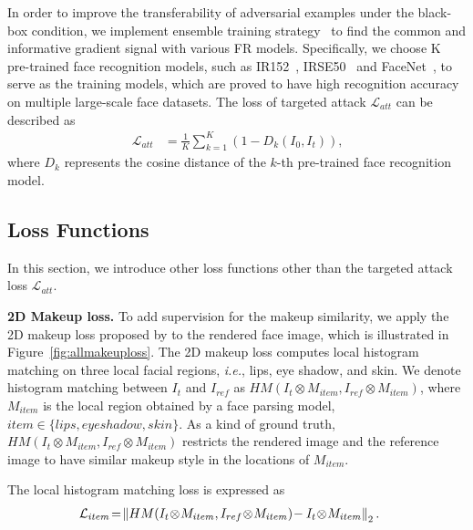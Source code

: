 \documentclass[10pt,journal,compsoc]{IEEEtran}
\begin{document}
In order to improve the transferability of adversarial examples under the black-box condition, we implement ensemble training strategy~\cite{liu2016delving,dong2018boosting,yin2021adv,hu2022protecting} to find the common and informative gradient signal with various FR models. Specifically, we choose K pre-trained face recognition models, such as IR152~\cite{he2016deep}, IRSE50~\cite{hu2018squeeze} and FaceNet~\cite{schroff2015facenet}, to serve as the training models, which are proved to have high recognition accuracy on multiple large-scale face datasets. The loss of targeted attack $\mathcal{L}_{att}$ can be described as 
\begin{equation}
	\begin{aligned}
	\mathcal{L}_{att} &=\frac{1}{K}\sum_{k=1}^{K}(1-D_k(I_0, I_t))\text{,}
	\end{aligned}
\end{equation} 
where $D_k$ represents the cosine distance of the $k$-th pre-trained face recognition model. 

\subsection{Loss Functions}
\label{subsection:loss}
In this section, we introduce other loss functions other than the targeted attack loss $\mathcal{L}_{att}$.

{\bf 2D Makeup loss.}
To add supervision for the makeup similarity, we apply the 2D makeup loss proposed by \cite{li2018beautygan} to the rendered face image, which is illustrated in Figure~\ref{fig:allmakeuploss}. The 2D makeup loss computes local histogram matching on three local facial regions, \emph{i.e.}, lips, eye shadow, and skin.
We denote histogram matching between $I_{t}$ and $I_{ref}$ as $HM(I_{t} \otimes M_{item},I_{ref} \otimes M_{item})$, where $M_{item}$ is the local region obtained by a face parsing model, $item \in \{lips, eye shadow, skin\}$. 
As a kind of ground truth, $HM(I_{t} \otimes M_{item},I_{ref} \otimes M_{item})$ restricts the rendered image and the reference image to have similar makeup style in the locations of $M_{item}$.

The local histogram matching loss is expressed as 
\begin{equation}
	\begin{aligned}
		\hspace{-4mm}\mathcal{L}_{item}\!=\!\left\|HM(I_{t}\!\otimes\!M_{item},I_{ref}\!\otimes\!M_{item})\!-I_{t}\!\otimes\!M_{item}\right\|_{2} \text{.}
\end{aligned}
\end{equation}
\end{document}
